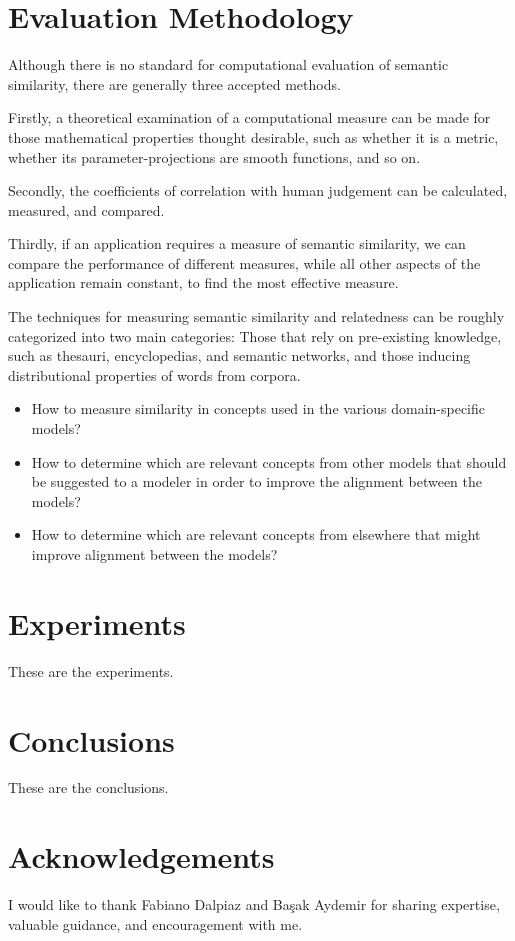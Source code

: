 \documentclass{article}
\begin{document}
\section{Evaluation Methodology}

Although there is no standard for computational evaluation of semantic similarity, there are generally three accepted methods.\cite{meng2013review}

Firstly, a theoretical examination of a computational measure can be made for those mathematical properties thought desirable, such as whether it is a metric, whether its parameter-projections are smooth functions, and so on. %

Secondly, the coefficients of correlation with human judgement can be calculated, measured, and compared.\cite{zhou2008new,seco2004intrinsic}

Thirdly, if an application requires a measure of semantic similarity, we can compare the performance of different measures, while all other aspects of the application remain constant, to find the most effective measure.\cite{blanchard2006tree,budanitsky2006evaluating}

The techniques for measuring semantic similarity and relatedness can be roughly categorized into two main categories:\cite{agirre2009study} Those that rely on pre-existing knowledge, such as thesauri, encyclopedias, and semantic networks,\cite{alvarez2007graph,yang2005measuring,hughes2007lexical} and those inducing distributional properties of words from corpora.\cite{sahami2006web,chen2006novel,bollegala2007measuring}


\begin{itemize}
\item How to measure similarity in concepts used in the various domain-specific models?
\item How to determine which are relevant concepts from other models that should be suggested to a modeler in order to improve the alignment between the models?
\item How to determine which are relevant concepts from elsewhere that might improve alignment between the models?
\end{itemize}

\section{Experiments}

These are the experiments.

\section{Conclusions}

These are the conclusions.

\section{Acknowledgements}

I would like to thank Fabiano Dalpiaz and Ba\c sak Aydemir for sharing expertise, valuable guidance, and encouragement with me.

\printbibliography
\end{document}

